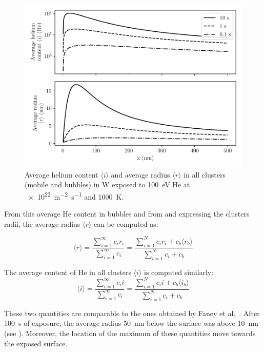 \begin{figure}
    \centering
    \includegraphics[width=0.75\linewidth]{Figures/Chapter4/half_slab/average_content_radius.pdf}
    \caption{Average helium content $\langle i \rangle$ and average radius $\langle r \rangle$ in all clusters (mobile and bubbles) in \gls{W} exposed to \SI{100}{eV} \gls{He} at \SI{e22}{m^{-2}.s^{-1}} and \SI{1000}{K}.}
\end{figure}

From this average \gls{He} content in bubbles and from  and  expressing the clusters radii, the average radius $\langle r \rangle$ can be computed as:

\begin{equation}
        \langle r \rangle = \frac{\sum\limits_{i=1}^\infty c_i r_i}{\sum\limits_{i=1}^\infty c_i}
        = \frac{\sum\limits_{i=1}^N c_i r_i + c_b \langle r_b \rangle }{\sum\limits_{i=1}^N c_i + c_b}
\end{equation}

The average content of \gls{He} in all clusters $\langle i \rangle$ is computed similarly:
\begin{equation}
        \langle i \rangle = \frac{\sum\limits_{i=1}^\infty c_i i}{\sum\limits_{i=1}^\infty c_i}
        = \frac{\sum\limits_{i=1}^N c_i i + c_b \langle i_b \rangle }{\sum\limits_{i=1}^N c_i + c_b}
\end{equation}

These two quantities are comparable to the ones obtained by Faney et al.\ .
After \SI{100}{s} of exposure, the average radius \SI{50}{nm} below the surface was above \SI{10}{nm} (see ).
Moreover, the location of the maximum of these quantities move towards the exposed surface.


